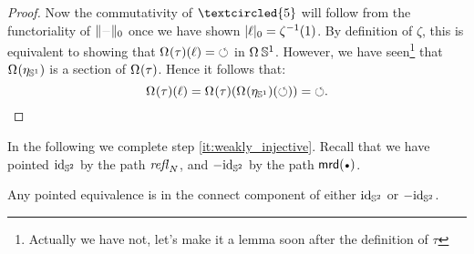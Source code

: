 \documentclass[english,a4]{article}
\newcommand{\setTrunc}[1]{\Trunc{#1}_0}
\newcommand{\settrunc}[1]{\trunc{#1}_0}
\begin{document}
\begin{proof}
  Now the commutativity of $\textcircled{\small 5}$ will follow from the
  functoriality of $\setTrunc\blank$ once we have shown $\settrunc \ell =
  \inv\zeta(1)$. By definition of $\zeta$, this is equivalent to showing that
  $\loopspace\null(\tau) (\ell) = \Sloop$ in $\loopspace\null \Sc$. However, we
  have seen\footnote{\color{red}Actually we have not, let's make it a lemma
  soon after the definition of $\tau$} that $\loopspace\null (\eta_\Sc)$ is a
  section of $\loopspace\null(\tau)$. Hence it follows that:
  \begin{displaymath}
    \loopspace\null(\tau)(\ell) = \loopspace\null(\tau)(\loopspace\null(\eta_\Sc)(\Sloop)) = \Sloop.
  \end{displaymath}
\end{proof}

In the following we complete step \ref{it:weakly_injective}. 
Recall that we have pointed $\mathord{\mathrm{id}}_{{\mathbb S^{2}}}$ by the path $\mathop{{\mathit{refl}}_{N}}$, 
and $-\mathord{\mathrm{id}}_{{\mathbb S^{2}}}$ by the path $\mrd(\base)$.
\begin{corollary}
  Any pointed equivalence is in the connect component of either $\mathord{\mathrm{id}}_{{\mathbb S^{2}}}$ or $-\mathord{\mathrm{id}}_{{\mathbb S^{2}}}$.
  \label{cor:equivalence-conn-component}
\end{corollary}
\end{document}
